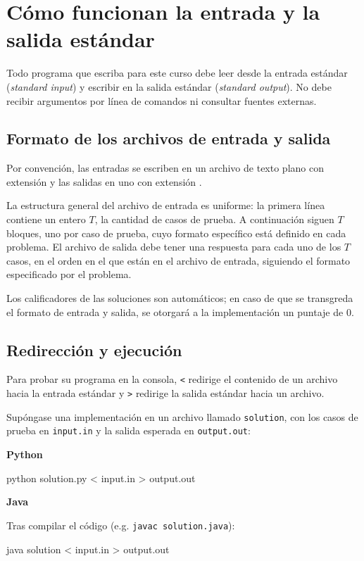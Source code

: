 \section{Cómo funcionan la entrada y la salida estándar}
Todo programa que escriba para este curso debe leer desde la entrada estándar (\textit{standard input}) y escribir en la salida estándar (\textit{standard output}). No debe recibir argumentos por línea de comandos ni consultar fuentes externas.

\subsection{Formato de los archivos de entrada y salida}

Por convención, las entradas se escriben en un archivo de texto plano con extensión  y las salidas en uno con extensión .

La estructura general del archivo de entrada es uniforme: la primera línea contiene un entero $T$, la cantidad de casos de prueba. A continuación siguen $T$ bloques, uno por caso de prueba, cuyo formato específico está definido en cada problema. El archivo de salida debe tener una respuesta para cada uno de los \(T\) casos, en el orden en el que están en el archivo de entrada, siguiendo el formato especificado por el problema.

Los calificadores de las soluciones son automáticos; en caso de que se transgreda el formato de entrada y salida, se otorgará a la implementación un puntaje de 0.

\subsection{Redirección y ejecución}

Para probar su programa en la consola, \texttt{<} redirige el contenido de un archivo hacia la entrada estándar y \texttt{>} redirige la salida estándar hacia un archivo.

Supóngase una implementación en un archivo llamado \texttt{solution}, con los casos de prueba en \texttt{input.in} y la salida esperada en \texttt{output.out}:

\textbf{Python}
\begin{pseudocode}
python solution.py < input.in > output.out
\end{pseudocode}

\textbf{Java}

Tras compilar el código (e.g. \texttt{javac solution.java}):
\begin{pseudocode}
java solution < input.in > output.out
\end{pseudocode}

